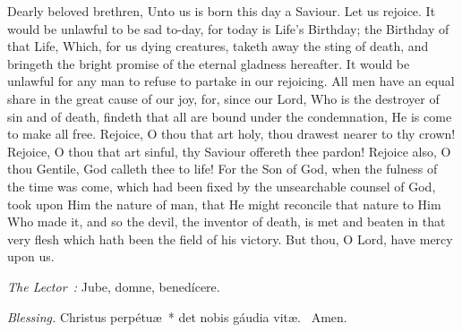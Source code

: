 {{    \begin{parcolumns}[rulebetween,colwidths={1=.42\linewidth}]{2}
    {Dearly beloved brethren, Unto us is born this day a Saviour. Let us rejoice. It would be unlawful to be sad to-day, for today is Life's Birthday; the Birthday of that Life, Which, for us dying creatures, taketh away the sting of death, and bringeth the bright promise of the eternal gladness hereafter. It would be unlawful for any man to refuse to partake in our rejoicing. All men have an equal share in the great cause of our joy, for, since our Lord, Who is the destroyer of sin and of death, findeth that all are bound under the condemnation, He is come to make all free. Rejoice, O thou that art holy, thou drawest nearer to thy crown! Rejoice, O thou that art sinful, thy Saviour offereth thee pardon! Rejoice also, O thou Gentile, God calleth thee to life! For the Son of God, when the fulness of the time was come, which had been fixed by the unsearchable counsel of God, took upon Him the nature of man, that He might reconcile that nature to Him Who made it, and so the devil, the inventor of death, is met and beaten in that very flesh which hath been the field of his victory.
      But thou, O Lord, have mercy upon us.}
    \end{parcolumns}

  }

  {
    \bigskip
    \medskip

    \emph{The Lector~:} Jube, domne, benedícere.

    \emph{Blessing.} Christus perpétuæ~* det nobis gáudia vitæ. \Rbar{}~Amen.
  }

}
